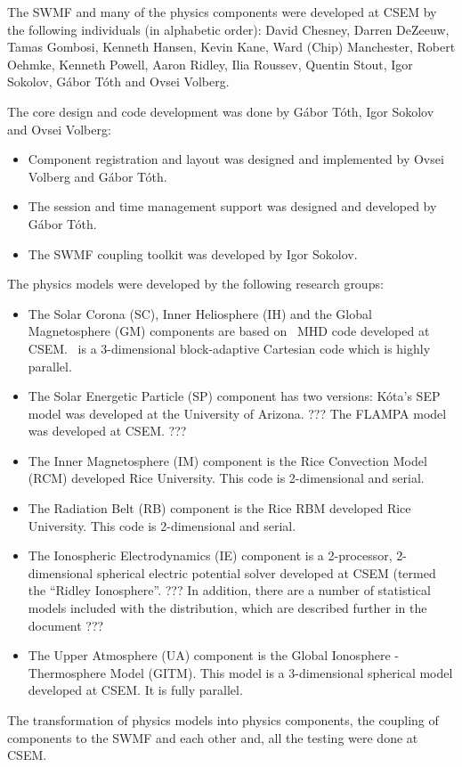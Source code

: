The SWMF and many of the physics components were developed at CSEM
by the following individuals (in alphabetic order):
David Chesney,
Darren DeZeeuw, Tamas Gombosi, Kenneth Hansen, Kevin Kane, Ward (Chip)
Manchester, Robert Oehmke, Kenneth Powell, Aaron Ridley, Ilia Roussev,
Quentin Stout, Igor Sokolov, G\'abor T\'oth and Ovsei Volberg.

The core design and code development was done by G\'abor
T\'oth, Igor Sokolov and Ovsei Volberg:
\begin{itemize}
\item Component registration and layout was designed and implemented by 
      Ovsei Volberg and G\'abor T\'oth.
\item The session and time management support was designed and
      developed by G\'abor T\'oth.
\item The SWMF coupling toolkit was developed by Igor Sokolov.
\end{itemize}
The physics models were developed by the following research groups:
\begin{itemize}
\item
The Solar Corona (SC), Inner Heliosphere (IH) and the Global Magnetosphere 
(GM) components are based on \BATSRUS\ MHD code developed at CSEM. 
\BATSRUS\ is a 3-dimensional block-adaptive Cartesian code which is 
highly parallel.

\item
The Solar Energetic Particle (SP) component has two versions:
K\'ota's SEP model was developed at the University of Arizona.
???
The FLAMPA model was developed at CSEM.
???

\item
The Inner Magnetosphere (IM) component is the Rice Convection Model
(RCM) developed Rice University.  This code is 2-dimensional and
serial.

\item
The Radiation Belt (RB) component is the Rice RBM
developed Rice University.  This code is 2-dimensional and
serial.

\item
The Ionospheric Electrodynamics (IE) component is a 2-processor,
2-dimensional spherical electric potential solver developed at CSEM
(termed the ``Ridley Ionosphere''.  
???
In addition, there are a number of
statistical models included with the distribution, which are described
further in the document ???

\item
The Upper Atmosphere (UA) component is the Global Ionosphere -
Thermosphere Model (GITM).  This model is a 3-dimensional spherical
model developed at CSEM.  It is fully parallel.

\end{itemize}
The transformation of physics models into physics components,
the coupling of components to the SWMF and each other and,
all the testing were done at CSEM.

